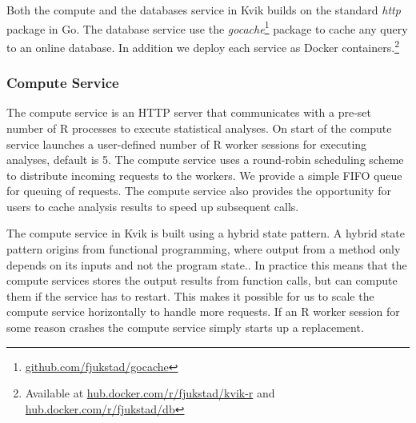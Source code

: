 Both the compute and the databases service in Kvik builds on the standard
\emph{http} package in Go. The database service use the
\emph{gocache}\footnote{\url{github.com/fjukstad/gocache}} package to cache any
query to an online database. In addition we deploy each service as Docker
containers.\footnote{Available at \url{hub.docker.com/r/fjukstad/kvik-r} and
\url{hub.docker.com/r/fjukstad/db}}

\subsubsection*{Compute Service} 
The compute service is an HTTP server that communicates with a pre-set number of
R processes to execute statistical analyses. On start of the compute service
launches a user-defined number of R worker sessions for executing analyses,
default is 5. The compute service uses a round-robin scheduling scheme to
distribute incoming requests to the workers. We provide a simple FIFO queue for
queuing of requests. The compute service also provides the opportunity for users
to cache analysis results to speed up subsequent calls.

The compute service in Kvik is built using a hybrid state pattern.
A hybrid state pattern origins from functional programming, where output from a
method only depends on its inputs and not the program state.\cite{opencpu}. In
practice this means that the compute services stores the output results from
function calls, but can compute them if the service has to restart. This makes
it possible for us to scale the compute service horizontally to handle more
requests. If an R worker session for some reason crashes the compute service
simply starts up a replacement. 

